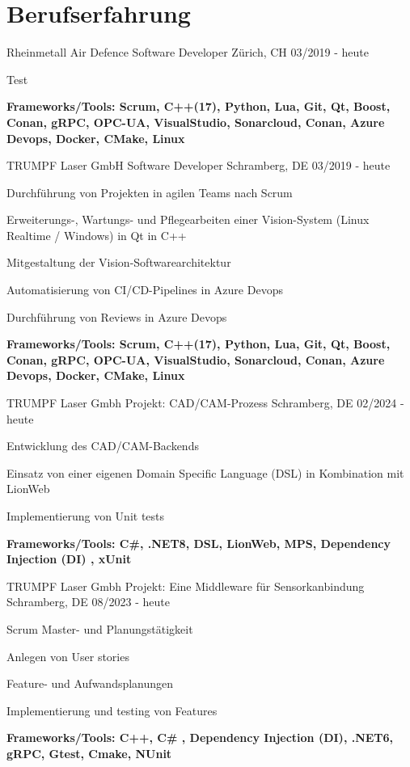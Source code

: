 \section{Berufserfahrung}

\cventry
{Rheinmetall Air Defence} %
{Software Developer } %
{Zürich, CH} %
{03/2019 - heute} %
\begin{cvitems}
\item{Test}
\item{\textbf{Frameworks/Tools:  Scrum,  C++(17), Python, Lua, Git, Qt, Boost, Conan, gRPC, OPC-UA, VisualStudio, Sonarcloud, Conan, Azure Devops, Docker, CMake, Linux}}
\end{cvitems}

\cventry
{TRUMPF Laser GmbH} %
{Software Developer } %
{Schramberg, DE} %
{03/2019 - heute} %
\begin{cvitems}
\item{Durchführung von Projekten in agilen Teams nach Scrum}
\item{ Erweiterungs-, Wartungs- und Pflegearbeiten einer Vision-System (Linux Realtime / Windows) in Qt in C++}
\item{Mitgestaltung der Vision-Softwarearchitektur}
\item{Automatisierung von CI/CD-Pipelines in Azure Devops}
\item{Durchführung von Reviews in Azure Devops}
\item{\textbf{Frameworks/Tools:  Scrum,  C++(17), Python, Lua, Git, Qt, Boost, Conan, gRPC, OPC-UA, VisualStudio, Sonarcloud, Conan, Azure Devops, Docker, CMake, Linux}}
\end{cvitems}

\cventry
{TRUMPF Laser Gmbh} %
{Projekt: CAD/CAM-Prozess} %
{Schramberg, DE} %
{02/2024 - heute} %
\begin{cvitems}
	\item{Entwicklung des CAD/CAM-Backends}
	\item{Einsatz von einer eigenen Domain Specific Language (DSL) in Kombination mit LionWeb}
	\item{Implementierung von Unit tests}
	\item{\textbf{Frameworks/Tools: C\#, .NET8, DSL, LionWeb, MPS,  Dependency Injection (DI) , xUnit}}
\end{cvitems}

\cventry
{TRUMPF Laser Gmbh} %
{Projekt: Eine Middleware für Sensorkanbindung} %
{Schramberg, DE} %
{08/2023 - heute} %
\begin{cvitems}
	\item{Scrum Master- und Planungstätigkeit}
	\item{Anlegen von User stories}
	\item{Feature- und Aufwandsplanungen}
	\item{Implementierung und testing von Features}
	\item{\textbf{Frameworks/Tools:  C++, C\# , Dependency Injection (DI), .NET6,  gRPC,  Gtest, Cmake, NUnit} }
\end{cvitems}


